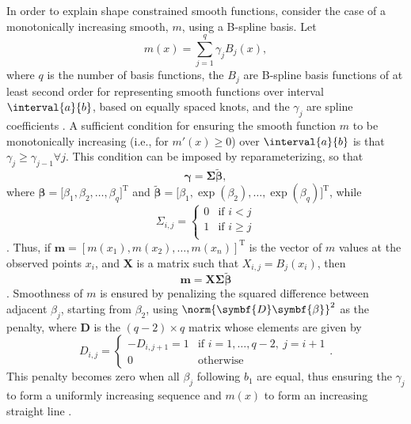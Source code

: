 In order to explain shape constrained smooth functions, consider the case of a monotonically increasing smooth, \(m\), using a B-spline basis.  Let
\begin{equation}
  \label{eq:SCAMMonotonicallyIncreasingSmooth}
  m(x) = \sum_{j = 1}^q \gamma_j B_j(x),
\end{equation}
where \(q\) is the number of basis functions, the \(B_j\) are B-spline basis functions of at least second order for representing smooth functions over interval \(\interval{a}{b}\), based on equally spaced knots, and the \(\gamma_j\) are spline coefficients \parencite{Pya2015}.  A sufficient condition for ensuring the smooth function \(m\) to be monotonically increasing (i.e., for \(m'(x) \geq 0\)) over \(\interval{a}{b}\) is that \(\gamma_j \geq \gamma_{j - 1} \forall j\).  This condition can be imposed by reparameterizing, so that
\begin{equation}
  \label{eq:SCAMReparameterizedGamma}
  \symbf{\gamma} = \symbf{\Sigma} \tilde{\symbf{\beta}},
\end{equation}
where \(\symbf{\beta} = \bigl[\beta_1, \beta_2, \ldots, \beta_q\bigr]^{\text{T}}\) and \(\tilde{\symbf{\beta}} = \bigl[\beta_1, \exp(\beta_2), \ldots, \exp(\beta_q)\bigr]^{\text{T}}\), while
\begin{equation}
  \label{eq:SCAMSigmaMontoneIncreasing}
  \Sigma_{i, j} =
  \begin{cases}
    0 &\text{if } i < j \\
    1 &\text{if } i \geq j \\
  \end{cases}
\end{equation}
\parencite{Pya2015}.
Thus, if \(\symbf{m} = [m(x_1), m(x_2), \ldots, m(x_n)]^{\text{T}}\) is the vector of \(m\) values at the observed points \(x_i\), and \(\symbf{X}\) is a matrix such that \(X_{i, j} = B_j(x_i)\), then
\begin{equation}
  \label{eq:SCAMConstrainedSmootherVector}
  \symbf{m} = \symbf{X} \symbf{\Sigma} \tilde{\symbf{\beta}}
\end{equation}
\parencite{Pya2015}.
Smoothness of \(m\) is ensured by penalizing the squared difference between adjacent \(\beta_j\), starting from \(\beta_2\), using \(\norm{\symbf{D} \symbf{\beta}}^2\) as the penalty, where \(\symbf{D}\) is the \((q-2) \times q\) matrix
whose elements are given by
\begin{equation}
  \label{eq:SCAMDMonotoneIncreasing}
  D_{i, j} = 
  \begin{cases}
    - D_{i, j + 1} = 1 &\text{if } i = 1, \ldots, q - 2,~ j = i + 1 \\
    0 &\text{otherwise}
  \end{cases}.
\end{equation}
This penalty becomes zero when all \(\beta_j\) following \(b_1\) are equal, thus ensuring the \(\gamma_j\) to form a uniformly increasing sequence and \(m(x)\) to form an increasing straight line \parencite{Pya2015}.

